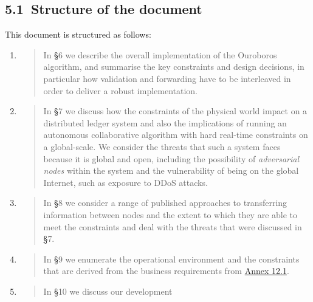 \documentclass[]{article}
\begin{document}
\hypertarget{structure-of-the-document}{%
\subsection{​5.1​~Structure of the
document}\label{structure-of-the-document}}

This document is structured as follows:

\begin{enumerate}
\def\labelenumi{\arabic{enumi}.}
\item
  \begin{quote}
  In \protect\hyperlink{overview}{{§}}6 we describe the overall
  implementation of the Ouroboros algorithm, and summarise the key
  constraints and design decisions, in particular how validation and
  forwarding have to be interleaved in order to deliver a robust
  implementation.
  \end{quote}
\item
  \begin{quote}
  In \protect\hyperlink{_gr58ztigrqbm}{{§}}7 we discuss how the
  constraints of the physical world impact on a distributed ledger
  system and also the implications of running an autonomous
  collaborative algorithm with hard real-time constraints on a
  global-scale. We consider the threats that such a system faces because
  it is global and open, including the possibility of \emph{adversarial
  nodes} within the system and the vulnerability of being on the global
  Internet, such as exposure to DDoS attacks.
  \end{quote}
\item
  \begin{quote}
  In \protect\hyperlink{_tkmbjtva6lkr}{{§}}8 we consider a range of
  published approaches to transferring information between nodes and the
  extent to which they are able to meet the constraints and deal with
  the threats that were discussed in
  \protect\hyperlink{_gr58ztigrqbm}{{§}}7.
  \end{quote}
\item
  \begin{quote}
  In \protect\hyperlink{_c2gr8venq915}{{§}}9 we enumerate the
  operational environment and the constraints that are derived from the
  business requirements from
  \protect\hyperlink{business-requirements}{{Annex 12.1}}.
  \end{quote}
\item
  \begin{quote}
  In \protect\hyperlink{_ky7e6si1z2eh}{{§}}10 we discuss our development

\end{quote}
\end{enumerate}
\end{document}
